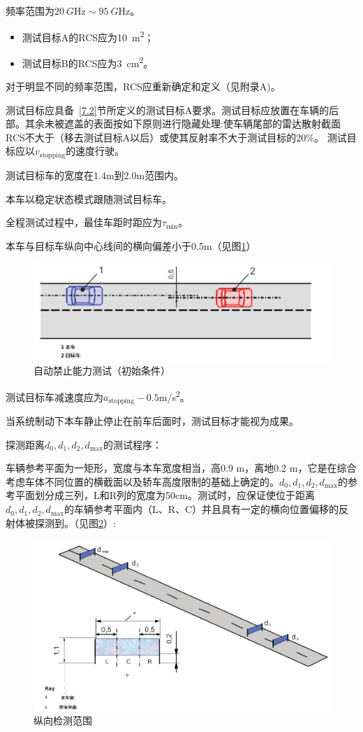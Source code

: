 \documentclass[is,copyright,is]{isov2}
\begin{document}
频率范围为$\SI{20}{G\hertz}\sim \SI{95}{G\hertz} $。
\begin{itemize}
	\item 测试目标A的RCS应为\SI{10}{m^2}；
	\item 测试目标B的RCS应为\SI{3}{cm^2}。
\end{itemize}
对于明显不同的频率范围，RCS应重新确定和定义（见附录A)。

测试目标应具备~\ref{7.2}节所定义的测试目标A要求。测试目标应放置在车辆的后部。其余未被遮盖的表面按如下原则进行隐藏处理:使车辆尾部的雷达散射截面RCS不大于（移去测试目标A以后）或使其反射率不大于测试目标的20\%。
测试目标应以$v_\text{stopping}$的速度行驶。

测试目标车的宽度在1.4m到2.0m范围内。

本车以稳定状态模式跟随测试目标车。

全程测试过程中，最佳车距时距应为$\tau_\text{min}$。

本车与目标车纵向中心线间的横向偏差小于0.5m（见图\ref{fig:stopcap}）
\begin{figure}[htbp]
	\centering
	\includegraphics[width=0.7\linewidth]{figures/stopcap}
	\caption{自动禁止能力测试（初始条件）}
	\label{fig:stopcap}
\end{figure}

测试目标车减速度应为$a_\text{stopping} - 0.5 $\si{m/s^2}。

当系统制动下本车静止停止在前车后面时，测试目标才能视为成果。

探测距离$d_0,d_1,d_2,d_\text{max}$的测试程序：

车辆参考平面为一矩形，宽度与本车宽度相当，高0.9 m，离地0.2 m，它是在综合考虑车体不同位置的横截面以及轿车高度限制的基础上确定的。$d_0,d_1,d_2,d_\text{max}$的参考平面划分成三列，L和R列的宽度为50cm。测试时，应保证使位于距离$d_0,d_1,d_2,d_\text{max}$的车辆参考平面内（L、R、C）并且具有一定的横向位置偏移的反射体被探测到。（见图\ref{fig:longdetection}）:
\begin{figure}[htbp]
	\centering
	\includegraphics[width=0.7\linewidth]{figures/longdetection}
	\caption{纵向检测范围}
	\label{fig:longdetection}
\end{figure}
\end{document}
